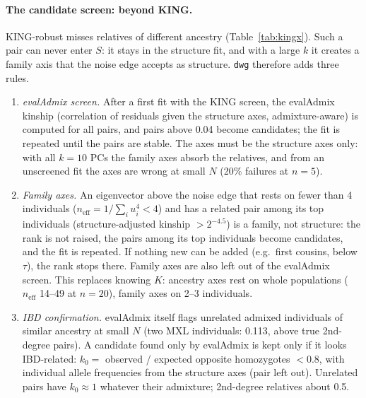 \documentclass[11pt,a4paper]{article}
\begin{document}
\paragraph{The candidate screen: beyond KING.} KING-robust misses relatives
of different ancestry (Table~\ref{tab:kingx}). Such a pair can never enter $S$:
it stays in the structure fit, and with a large $k$ it creates a family axis
that the noise edge accepts as structure. \texttt{dwg} therefore adds three
rules.
\begin{enumerate}
  \item \emph{evalAdmix screen.} After a first fit with the KING screen, the
    evalAdmix kinship (correlation of residuals given the structure axes,
    admixture-aware) is computed for all pairs, and pairs above 0.04 become
    candidates; the fit is repeated until the pairs are stable. The axes must
    be the structure axes only: with all $k=10$ PCs the family axes absorb the
    relatives, and from an unscreened fit the axes are wrong at small $N$
    (20\% failures at $n=5$).
  \item \emph{Family axes.} An eigenvector above the noise edge that rests on
    fewer than 4 individuals ($n_{\mathrm{eff}}=1/\sum_iu_i^4<4$) and has a
    related pair among its top individuals (structure-adjusted kinship
    $>2^{-4.5}$) is a family, not structure: the rank is not raised, the
    pairs among its top individuals become candidates, and the fit is
    repeated. If nothing new can be added (e.g.\ first cousins, below $\tau$),
    the rank stops there. Family axes are also left out of the evalAdmix
    screen. This replaces knowing $K$: ancestry axes rest on whole
    populations ($n_{\mathrm{eff}}$ 14--49 at $n=20$), family axes on 2--3
    individuals.
  \item \emph{IBD confirmation.} evalAdmix itself flags unrelated admixed
    individuals of similar ancestry at small $N$ (two MXL individuals: 0.113,
    above true 2nd-degree pairs). A candidate found only by evalAdmix is kept
    only if it looks IBD-related: $k_0=$ observed / expected opposite
    homozygotes $<0.8$, with individual allele frequencies from the structure
    axes (pair left out). Unrelated pairs have $k_0\approx1$ whatever their
    admixture; 2nd-degree relatives about 0.5.
\end{enumerate}
\end{document}
